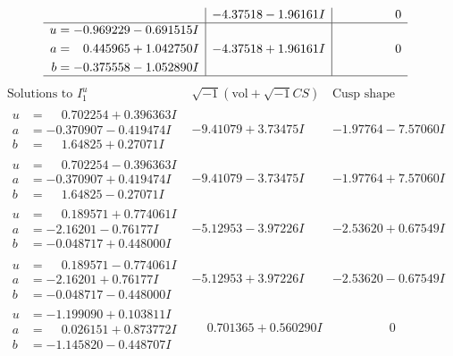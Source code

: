 \documentclass[1p]{elsarticle_modified}
\theoremstyle{definition}
\newcommand{\I}{\sqrt{-1}}
\begin{document}
$$\begin{array}{c|c|c}
 & -4.37518 - 1.96161 I & \phantom{-0.000000 } 0 \\ \hline\begin{aligned}
u &= -0.969229 - 0.691515 I \\
a &= \phantom{-}0.445965 + 1.042750 I \\
b &= -0.375558 - 1.052890 I\end{aligned}
 & -4.37518 + 1.96161 I & \phantom{-0.000000 } 0\\
 \hline 
 \end{array}$$\newpage$$\begin{array}{c|c|c}  
\text{Solutions to }I^u_{1}& \I (\text{vol} + \sqrt{-1}CS) & \text{Cusp shape}\\
 \hline 
\begin{aligned}
u &= \phantom{-}0.702254 + 0.396363 I \\
a &= -0.370907 - 0.419474 I \\
b &= \phantom{-}1.64825 + 0.27071 I\end{aligned}
 & -9.41079 + 3.73475 I & -1.97764 - 7.57060 I \\ \hline\begin{aligned}
u &= \phantom{-}0.702254 - 0.396363 I \\
a &= -0.370907 + 0.419474 I \\
b &= \phantom{-}1.64825 - 0.27071 I\end{aligned}
 & -9.41079 - 3.73475 I & -1.97764 + 7.57060 I \\ \hline\begin{aligned}
u &= \phantom{-}0.189571 + 0.774061 I \\
a &= -2.16201 - 0.76177 I \\
b &= -0.048717 + 0.448000 I\end{aligned}
 & -5.12953 - 3.97226 I & -2.53620 + 0.67549 I \\ \hline\begin{aligned}
u &= \phantom{-}0.189571 - 0.774061 I \\
a &= -2.16201 + 0.76177 I \\
b &= -0.048717 - 0.448000 I\end{aligned}
 & -5.12953 + 3.97226 I & -2.53620 - 0.67549 I \\ \hline\begin{aligned}
u &= -1.199090 + 0.103811 I \\
a &= \phantom{-}0.026151 + 0.873772 I \\
b &= -1.145820 - 0.448707 I\end{aligned}
 & \phantom{-}0.701365 + 0.560290 I & \phantom{-0.000000 } 0 \\ \hline\begin{aligned}

\end{aligned}
\end{array}$$
\end{document}
